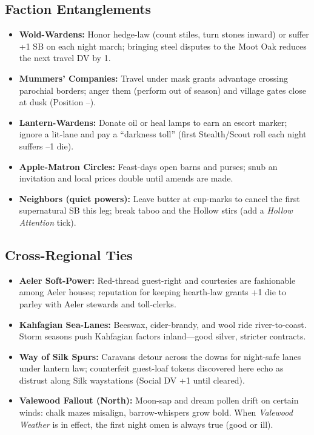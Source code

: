 \subsection*{Faction Entanglements}
\begin{itemize}
  \item \textbf{Wold-Wardens:} Honor hedge-law (count stiles, turn stones inward) or suffer +1 SB on each night march; bringing steel disputes to the Moot Oak reduces the next travel DV by 1.
  \item \textbf{Mummers' Companies:} Travel under mask grants advantage crossing parochial borders; anger them (perform out of season) and village gates close at dusk (Position --).
  \item \textbf{Lantern-Wardens:} Donate oil or heal lamps to earn an escort marker; ignore a lit-lane and pay a ``darkness toll'' (first Stealth/Scout roll each night suffers --1 die).
  \item \textbf{Apple-Matron Circles:} Feast-days open barns and purses; snub an invitation and local prices double until amends are made.
  \item \textbf{Neighbors (quiet powers):} Leave butter at cup-marks to cancel the first supernatural SB this leg; break taboo and the Hollow stirs (add a \emph{Hollow Attention} tick).
\end{itemize}

\subsection*{Cross-Regional Ties}
\begin{itemize}
  \item \textbf{Aeler Soft-Power:} Red-thread guest-right and courtesies are fashionable among Aeler houses; reputation for keeping hearth-law grants +1 die to parley with Aeler stewards and toll-clerks.
  \item \textbf{Kahfagian Sea-Lanes:} Beeswax, cider-brandy, and wool ride river-to-coast. Storm seasons push Kahfagian factors inland---good silver, stricter contracts.
  \item \textbf{Way of Silk Spurs:} Caravans detour across the downs for night-safe lanes under lantern law; counterfeit guest-loaf tokens discovered here echo as distrust along Silk waystations (Social DV +1 until cleared).
  \item \textbf{Valewood Fallout (North):} Moon-sap and dream pollen drift on certain winds: chalk mazes misalign, barrow-whispers grow bold. When \emph{Valewood Weather} is in effect, the first night omen is always true (good or ill).
\end{itemize}

